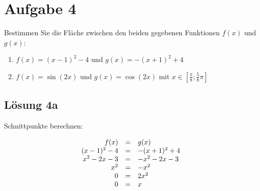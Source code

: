 \documentclass[main.tex]{subfiles}
\begin{document}
\section{Aufgabe 4}

Bestimmen Sie die Fläche zwischen den beiden gegebenen Funktionen $f( x)$ und $g( x)$:

\begin{enumerate}
    \item $f( x) =( x-1)^{2} -4$ und $g( x) =-( x+1)^{2} +4$
    \item $f( x) =\sin( 2x)$ und $g( x) =\cos( 2x)$ mit $x\in \left[\frac{\pi }{8} ;\frac{5}{8} \pi \right]$
\end{enumerate}

\subsection{Lösung 4a}

Schnittpunkte berechnen:


\begin{gather*}
\begin{array}{ r c l }
f( x) & = & g( x)\\
( x-1)^{2} -4 & = & -( x+1)^{2} +4\\
x^{2} -2x-3 & = & -x^{2} -2x-3\\
x^{2} & = & -x^{2}\\
0 & = & 2x^{2}\\
0 & = & x
\end{array}\\
\\
\end{gather*}
\end{document}
